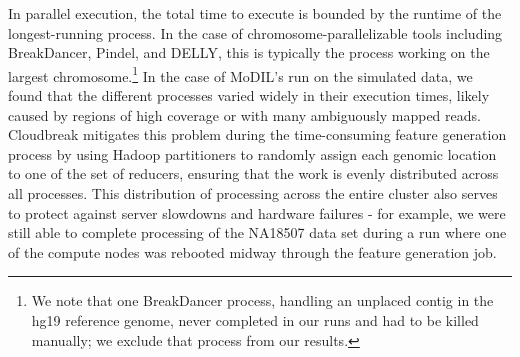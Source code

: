 \begin{table}
\begin{center}
\end{center}
\caption{Runtimes (elapsed) on both data sets of each tool tested, in single-processor and parallel mode. For parallel runs, Proc. is the maximum number of simultaneously running processes or threads. All times are in seconds. The types of variants detected by each program are listed with the abbreviations: D - deletion; I - insertion; V - Inversion; P - duplication; T - translocation. Interchromosomal translocations are only detected by BreakDancer in single CPU mode. }
\label{runtimes}
\end{table}

In parallel execution, the total time to execute is bounded by the runtime of the longest-running process. In the case of chromosome-parallelizable tools including BreakDancer, Pindel, and DELLY, this is typically the process working on the largest chromosome.\footnote{We note that one BreakDancer process, handling an unplaced contig in the hg19 reference genome, never completed in our runs and had to be killed manually; we exclude that process from our results.} In the case of MoDIL's run on the simulated data, we found that the different processes varied widely in their execution times, likely caused by regions of high coverage or with many ambiguously mapped reads. Cloudbreak mitigates this problem during the time-consuming feature generation process by using Hadoop partitioners to randomly assign each genomic location to one of the set of reducers, ensuring that the work is evenly distributed across all processes. This distribution of processing across the entire cluster also serves to protect against server slowdowns and hardware failures - for example, we were still able to complete processing of the NA18507 data set during a run where one of the compute nodes was rebooted midway through the feature generation job.

